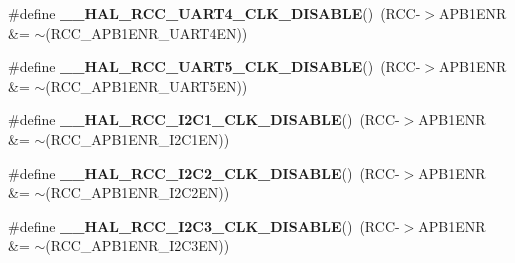 \begin{DoxyCompactItemize}
\item 
\mbox{\label{group___r_c_c_ex___peripheral___clock___enable___disable_ga0c7d9a072dd5ad3f28220667001bfc08}} 
\#define {\bfseries \+\_\+\+\_\+\+H\+A\+L\+\_\+\+R\+C\+C\+\_\+\+U\+A\+R\+T4\+\_\+\+C\+L\+K\+\_\+\+D\+I\+S\+A\+B\+LE}()~(R\+CC-\/$>$A\+P\+B1\+E\+NR \&= $\sim$(R\+C\+C\+\_\+\+A\+P\+B1\+E\+N\+R\+\_\+\+U\+A\+R\+T4\+EN))
\item 
\mbox{\label{group___r_c_c_ex___peripheral___clock___enable___disable_ga8a95ee8616f039fd0b00b0efa7297e6c}} 
\#define {\bfseries \+\_\+\+\_\+\+H\+A\+L\+\_\+\+R\+C\+C\+\_\+\+U\+A\+R\+T5\+\_\+\+C\+L\+K\+\_\+\+D\+I\+S\+A\+B\+LE}()~(R\+CC-\/$>$A\+P\+B1\+E\+NR \&= $\sim$(R\+C\+C\+\_\+\+A\+P\+B1\+E\+N\+R\+\_\+\+U\+A\+R\+T5\+EN))
\item 
\mbox{\label{group___r_c_c_ex___peripheral___clock___enable___disable_ga490a853eae72da96aad5379a6e939dd8}} 
\#define {\bfseries \+\_\+\+\_\+\+H\+A\+L\+\_\+\+R\+C\+C\+\_\+\+I2\+C1\+\_\+\+C\+L\+K\+\_\+\+D\+I\+S\+A\+B\+LE}()~(R\+CC-\/$>$A\+P\+B1\+E\+NR \&= $\sim$(R\+C\+C\+\_\+\+A\+P\+B1\+E\+N\+R\+\_\+\+I2\+C1\+EN))
\item 
\mbox{\label{group___r_c_c_ex___peripheral___clock___enable___disable_ga3ebc5988bcf1e2965ed482fd76c67b22}} 
\#define {\bfseries \+\_\+\+\_\+\+H\+A\+L\+\_\+\+R\+C\+C\+\_\+\+I2\+C2\+\_\+\+C\+L\+K\+\_\+\+D\+I\+S\+A\+B\+LE}()~(R\+CC-\/$>$A\+P\+B1\+E\+NR \&= $\sim$(R\+C\+C\+\_\+\+A\+P\+B1\+E\+N\+R\+\_\+\+I2\+C2\+EN))
\item 
\mbox{\label{group___r_c_c_ex___peripheral___clock___enable___disable_gab015d6340996f59fa36354ddcc10759d}} 
\#define {\bfseries \+\_\+\+\_\+\+H\+A\+L\+\_\+\+R\+C\+C\+\_\+\+I2\+C3\+\_\+\+C\+L\+K\+\_\+\+D\+I\+S\+A\+B\+LE}()~(R\+CC-\/$>$A\+P\+B1\+E\+NR \&= $\sim$(R\+C\+C\+\_\+\+A\+P\+B1\+E\+N\+R\+\_\+\+I2\+C3\+EN))
\item 
\mbox{\label{group___r_c_c_ex___peripheral___clock___enable___disable_gad8f3d2055731b09adc0e9588a1dce823}} 

\end{DoxyCompactItemize}
